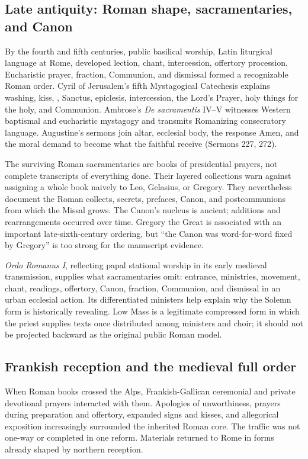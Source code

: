 \subsection{Late antiquity: Roman shape, sacramentaries, and Canon}

By the fourth and fifth centuries, public basilical worship, Latin liturgical language at Rome, developed lection, chant, intercession, offertory procession, Eucharistic prayer, fraction, Communion, and dismissal formed a recognizable Roman order. Cyril of Jerusalem's fifth Mystagogical Catechesis explains washing, kiss, , Sanctus, epiclesis, intercession, the Lord's Prayer, holy things for the holy, and Communion. Ambrose's \emph{De sacramentis} IV--V witnesses Western baptismal and eucharistic mystagogy and transmits Romanizing consecratory language. Augustine's sermons join altar, ecclesial body, the response Amen, and the moral demand to become what the faithful receive (Sermons 227, 272).

The surviving Roman sacramentaries are books of presidential prayers, not complete transcripts of everything done. Their layered collections warn against assigning a whole book naively to Leo, Gelasius, or Gregory. They nevertheless document the Roman collects, secrets, prefaces, Canon, and postcommunions from which the Missal grows. The Canon's nucleus is ancient; additions and rearrangements occurred over time. Gregory the Great is associated with an important late-sixth-century ordering, but ``the Canon was word-for-word fixed by Gregory'' is too strong for the manuscript evidence.

\emph{Ordo Romanus I}, reflecting papal stational worship in its early medieval transmission, supplies what sacramentaries omit: entrance, ministries, movement, chant, readings, offertory, Canon, fraction, Communion, and dismissal in an urban ecclesial action. Its differentiated ministers help explain why the Solemn form is historically revealing. Low Mass is a legitimate compressed form in which the priest supplies texts once distributed among ministers and choir; it should not be projected backward as the original public Roman model.

\subsection{Frankish reception and the medieval full order}

When Roman books crossed the Alps, Frankish-Gallican ceremonial and private devotional prayers interacted with them. Apologies of unworthiness, prayers during preparation and offertory, expanded signs and kisses, and allegorical exposition increasingly surrounded the inherited Roman core. The traffic was not one-way or completed in one reform. Materials returned to Rome in forms already shaped by northern reception.

